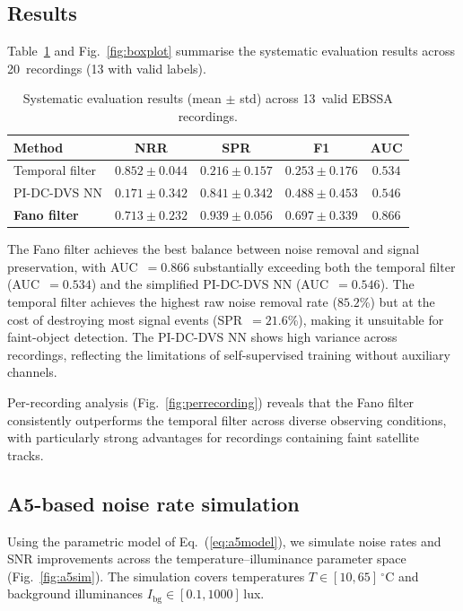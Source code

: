 \documentclass[twocolumn]{article}
\begin{document}
\subsection{Results}

Table~\ref{tab:results} and Fig.~\ref{fig:boxplot} summarise the systematic evaluation results across 20~recordings (13 with valid labels).

\begin{table}[htbp]
\centering
\caption{Systematic evaluation results (mean $\pm$ std) across 13~valid EBSSA recordings.}
\label{tab:results}
\begin{tabular}{@{}lcccc@{}}
\toprule
Method & NRR & SPR & F1 & AUC \\
\midrule
Temporal filter & $0.852 \pm 0.044$ & $0.216 \pm 0.157$ & $0.253 \pm 0.176$ & $0.534$ \\
PI-DC-DVS NN & $0.171 \pm 0.342$ & $0.841 \pm 0.342$ & $0.488 \pm 0.453$ & $0.546$ \\
\textbf{Fano filter} & $\mathbf{0.713 \pm 0.232}$ & $\mathbf{0.939 \pm 0.056}$ & $\mathbf{0.697 \pm 0.339}$ & $\mathbf{0.866}$ \\
\bottomrule
\end{tabular}
\end{table}

The Fano filter achieves the best balance between noise removal and signal preservation, with AUC~$= 0.866$ substantially exceeding both the temporal filter (AUC~$= 0.534$) and the simplified PI-DC-DVS NN (AUC~$= 0.546$).
The temporal filter achieves the highest raw noise removal rate ($85.2$\%) but at the cost of destroying most signal events (SPR~$= 21.6$\%), making it unsuitable for faint-object detection.
The PI-DC-DVS NN shows high variance across recordings, reflecting the limitations of self-supervised training without auxiliary channels.

Per-recording analysis (Fig.~\ref{fig:perrecording}) reveals that the Fano filter consistently outperforms the temporal filter across diverse observing conditions, with particularly strong advantages for recordings containing faint satellite tracks.

\subsection{A5-based noise rate simulation}

Using the parametric model of Eq.~(\ref{eq:a5model}), we simulate noise rates and SNR improvements across the temperature--illuminance parameter space (Fig.~\ref{fig:a5sim}).
The simulation covers temperatures $T \in [10, 65]\,^\circ$C and background illuminances $I_\mathrm{bg} \in [0.1, 1000]$\,lux.
\end{document}
